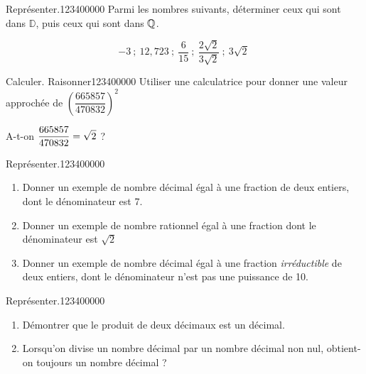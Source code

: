 \begin{pageAD}  %
\restoregeometry %




\begin{ExoCad}{Représenter.}{1234}{0}{0}{0}{0}{0}
Parmi les nombres suivants, déterminer ceux qui sont dans
$\mathbb D$, puis ceux qui sont dans $\mathbb Q$.

\[-3~;~12,723~;~\frac 6{15}~;~\frac{2\sqrt 2}{3\sqrt 2}~;~3\sqrt 2~ \]

\end{ExoCad}

\begin{ExoCad}{Calculer. Raisonner}{1234}{0}{0}{0}{0}{0}
Utiliser une calculatrice pour donner une valeur approchée de
$\left(\dfrac{665857}{470832}\right)^2$

A-t-on $\displaystyle \dfrac{665857}{470832}=\sqrt 2$ ?
\end{ExoCad}


\begin{ExoCad}{Représenter.}{1234}{0}{0}{0}{0}{0}
\begin{enumerate}
\item Donner un exemple de nombre décimal égal à une fraction de deux entiers, dont le dénominateur est 7.
\item Donner un exemple de nombre rationnel égal à une fraction dont le dénominateur est $\sqrt 2$
\item Donner un exemple de nombre décimal égal à une fraction
{\em irréductible} de deux entiers, dont le dénominateur n'est pas
une puissance de 10.
\end{enumerate}
\end{ExoCad}

\begin{ExoCad}{Représenter.}{1234}{0}{0}{0}{0}{0}
\begin{enumerate}
\item Démontrer que le produit de deux décimaux est un décimal.
\item Lorsqu'on divise un nombre décimal par un nombre décimal non nul,
obtient-on toujours un nombre décimal ?
\end{enumerate}
\end{ExoCad}

 
\end{pageAD} %


